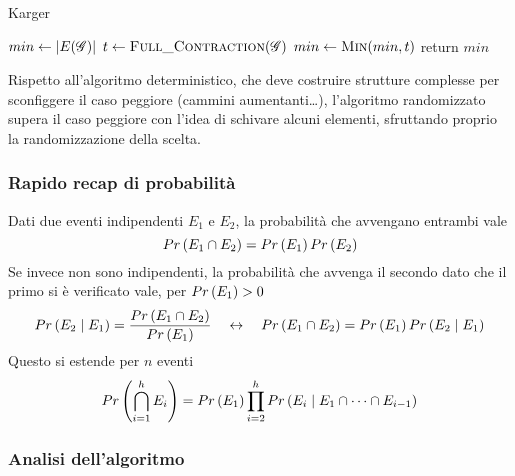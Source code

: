 \begin{algorithm}[H]
\caption{Karger}\label{alg:karger}
\begin{algorithmic}[1]
        \State $min \gets |E(\mathscr{G}{})| $
            \State $t \gets \Call{Full\_Contraction}{\bgg{}} $
            \State $min \gets \Call{Min}{min, t} $
        \EndRepLoop
        \State return $min$
    \EndProcedure
\end{algorithmic}
\end{algorithm}
\noindent
Rispetto all'algoritmo deterministico, che deve costruire strutture complesse per sconfiggere il caso peggiore (cammini aumentanti\ldots), l'algoritmo randomizzato supera il caso peggiore con l'idea di schivare alcuni elementi, sfruttando proprio la randomizzazione della scelta.

\subsubsection{Rapido recap di probabilità}

Dati due eventi indipendenti $
E_1
$ e $
E_2
$, la probabilità che avvengano entrambi vale
\begin{equation*}
    Pr\left(
        E_1 \cap E_2
    \right)
    =
    Pr\left(E_1\right)
    Pr\left(E_2\right)
\end{equation*}
Se invece non sono indipendenti, la probabilità che avvenga il secondo dato che il primo si è verificato vale,
per $
Pr\left(E_1\right) > 0
$
\begin{equation*}
    Pr\left(E_2 \mid E_1\right)
    =
    \frac{
        Pr\left( E_1 \cap E_2 \right)
    }{
        Pr\left(E_1\right)
    }
    \quad
    \leftrightarrow
    \quad
    Pr\left( E_1 \cap E_2 \right)
    =
    Pr\left(E_1\right)
    Pr\left(E_2 \mid E_1\right)
\end{equation*}
Questo si estende per $n$ eventi
\begin{equation*}
    Pr\left(
        \bigcap_{i=1}^{h} E_i
    \right)
    =
    Pr\left(E_1\right)
    \prod_{i=2}^{h}
    Pr\left(
        E_i \mid
        E_1 \cap \cdots \cap E_{i-1}
    \right)
\end{equation*}

\subsubsection{Analisi dell'algoritmo}

